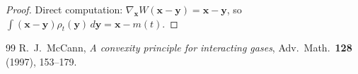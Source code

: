 \documentclass[10pt,a4paper]{amsart}
\newcommand{\bx}{\mathbf{x}}
\newcommand{\by}{\mathbf{y}}
\begin{document}
\begin{proof}
Direct computation: $\nabla_{\bx}W(\bx-\by)=\bx-\by$, so
$\int(\bx-\by)\rho_t(\by)\,d\by=\bx-m(t)$.
\end{proof}

\begin{thebibliography}{99}
 R.~J.\ McCann, \textit{A convexity principle for interacting gases}, Adv.\ Math.\ \textbf{128} (1997), 153--179.
\end{thebibliography}
\end{document}
